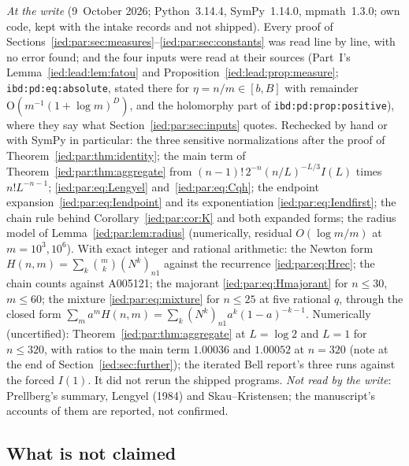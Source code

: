 \documentclass[11pt,letterpaper]{article}
\theoremstyle{remark}\newtheorem{remark}[theorem]{Remark}
\newcommand{\Oh}{\mathrm O}\newcommand{\supp}{\operatorname{supp}}
\newcommand{\file}[1]{\nolinkurl{#1}}
\begin{document}
\emph{At the write} (9~October 2026; Python~3.14.4, SymPy~1.14.0, mpmath~1.3.0;
own code, kept with the intake records and not shipped). Every proof of
Sections~\ref{ied:par:sec:measures}--\ref{ied:par:sec:constants} was read line
by line, with no error found; and the four inputs were read at their sources
(Part~I's Lemma~\ref{ied:lead:lem:fatou} and
Proposition~\ref{ied:lead:prop:measure}; \file{ibd:pd:eq:absolute}, stated there
for $\eta=n/m\in[b,B]$ with remainder $\Oh(m^{-1}(1+\log m)^D)$, and the
holomorphy part of \file{ibd:pd:prop:positive}), where they say what
Section~\ref{ied:par:sec:inputs} quotes. Rechecked by hand or with SymPy in
particular: the three sensitive normalizations after the proof of
Theorem~\ref{ied:par:thm:identity}; the main term of
Theorem~\ref{ied:par:thm:aggregate} from $(n-1)!\,2^{-n}(n/L)^{-L/3}I(L)$ times
$n!L^{-n-1}$; \eqref{ied:par:eq:Lengyel} and~\eqref{ied:par:eq:Cqh}; the endpoint
expansion~\eqref{ied:par:eq:Iendpoint} and its exponentiation
\eqref{ied:par:eq:Iendfirst}; the chain rule behind
Corollary~\ref{ied:par:cor:K} and both expanded forms; the radius model of
Lemma~\ref{ied:par:lem:radius} (numerically, residual $O(\log m/m)$ at
$m=10^3,10^6$). With exact integer and rational arithmetic: the Newton form
$H(n,m)=\sum_k\binom mk(N^k)_{n1}$ against the recurrence
\eqref{ied:par:eq:Hrec}; the chain counts against A005121; the majorant
\eqref{ied:par:eq:Hmajorant} for $n\le30$, $m\le60$; the mixture
\eqref{ied:par:eq:mixture} for $n\le25$ at five rational $q$, through the closed
form $\sum_ma^mH(n,m)=\sum_k(N^k)_{n1}a^k(1-a)^{-k-1}$. Numerically
(uncertified): Theorem~\ref{ied:par:thm:aggregate} at $L=\log2$ and $L=1$ for
$n\le320$, with ratios to the main term $1.00036$ and $1.00052$ at $n=320$
(note at the end of Section~\ref{ied:sec:further}); the iterated Bell
report's three runs against the forced $I(1)$. It did not rerun the shipped
programs. \emph{Not read by the write}: Prellberg's summary, Lengyel (1984) and
Skau--Kristensen; the manuscript's accounts of them are reported, not
confirmed.

\subsection{What is not claimed}\label{ied:par:sec:nonclaims}
\end{document}
